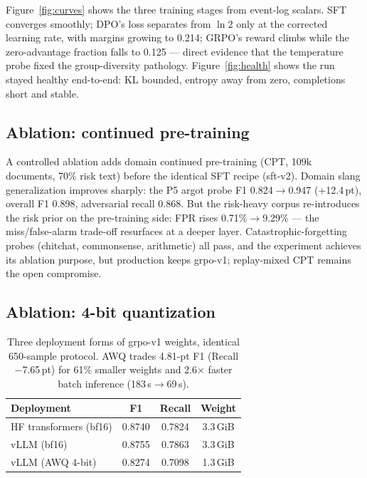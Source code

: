 \documentclass[11pt]{article}
\begin{document}
Figure~\ref{fig:curves} shows the three training stages from event-log scalars. SFT converges smoothly; DPO's loss separates from $\ln 2$ only at the corrected learning rate, with margins growing to 0.214; GRPO's reward climbs while the zero-advantage fraction falls to 0.125 --- direct evidence that the temperature probe fixed the group-diversity pathology. Figure~\ref{fig:health} shows the run stayed healthy end-to-end: KL bounded, entropy away from zero, completions short and stable.

\subsection{Ablation: continued pre-training}
\label{sec:cpt}
A controlled ablation adds domain continued pre-training (CPT, 109k documents, 70\% risk text) before the identical SFT recipe (sft-v2). Domain slang generalization improves sharply: the P5 argot probe F1 0.824$\rightarrow$0.947 (+12.4\,pt), overall F1 0.898, adversarial recall 0.868. But the risk-heavy corpus re-introduces the risk prior on the pre-training side: FPR rises 0.71\%$\rightarrow$9.29\% --- the miss/false-alarm trade-off resurfaces at a deeper layer. Catastrophic-forgetting probes (chitchat, commonsense, arithmetic) all pass, and the experiment achieves its ablation purpose, but production keeps grpo-v1; replay-mixed CPT remains the open compromise.

\subsection{Ablation: 4-bit quantization}
\label{sec:awq}

\begin{table}[t]
\centering\small
\setlength{\tabcolsep}{4pt}
\begin{tabular}{lccc}
\toprule
Deployment & F1 & Recall & Weight \\
\midrule
HF transformers (bf16) & 0.8740 & 0.7824 & 3.3\,GiB \\
vLLM (bf16) & 0.8755 & 0.7863 & 3.3\,GiB \\
vLLM (AWQ 4-bit) & 0.8274 & 0.7098 & 1.3\,GiB \\
\bottomrule
\end{tabular}
\caption{Three deployment forms of grpo-v1 weights, identical 650-sample protocol. AWQ trades 4.81-pt F1 (Recall $-$7.65\,pt) for 61\% smaller weights and 2.6$\times$ faster batch inference (183\,s$\rightarrow$69\,s).}
\label{tab:quant}
\end{table}
\end{document}

